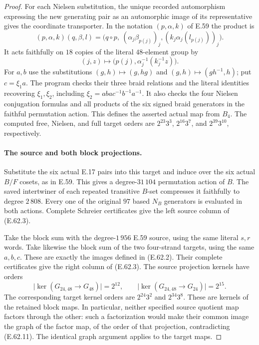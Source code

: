 \begin{proof}
For each Nielsen substitution, the unique recorded automorphism
expressing the new generating pair as an automorphic image of its
representative gives the coordinate transporter.  In the notation
$(p,\alpha,k)$ of E.59 the product is
\[
 (p,\alpha,k)(q,\beta,l)=
 \bigl(q\circ p,\ (\alpha_j\beta_{p(j)})_j,
                 (k_j\alpha_j(l_{p(j)}))_j\bigr).
 \tag{E.62.9}
\]
It acts faithfully on $18$ copies of the literal $48$-element group by
\[
 (j,z)\longmapsto
 \bigl(p(j),\alpha_j^{-1}(k_j^{-1}z)\bigr).
 \tag{E.62.10}
\]
For $a,b$ use the substitutions
$(g,h)\mapsto(g,hg)$ and $(g,h)\mapsto(gh^{-1},h)$; put $c=\xi_1a$.
The program checks their three braid relations and the literal identities
recovering $\xi_1,\xi_2$, including
$\xi_2=abac^{-1}b^{-1}a^{-1}$.  It also checks the four Nielsen
conjugation formulas and all products of the six signed braid generators
in the faithful permutation action.  This defines the asserted actual
map from $B_4$.  The computed free, Nielsen, and full target orders are
$2^{23}3^3$, $2^{16}3^7$, and $2^{39}3^{10}$, respectively.

\paragraph{The source and both block projections.}
Substitute the six actual E.17 pairs into this target and induce over the
six actual $B/F$ cosets, as in E.59.  This gives a degree-$31\,104$
permutation action of $B$.  The saved intertwiner of each repeated
transitive $B$-set compresses it faithfully to degree $2\,808$.
Every one of the original $97$ based $N_B$ generators is evaluated in
both actions.  Complete Schreier certificates give the left source
column of \textup{(E.62.3)}.

Take the block sum with the degree-$1\,956$ E.59 source, using the same
literal $s,r$ words.  Take likewise the block sum of the two four-strand
targets, using the same $a,b,c$.  These are exactly the images defined
in \textup{(E.62.2)}.  Their complete certificates give the right
column of \textup{(E.62.3)}.  The source projection kernels have orders
\[
 \bigl|\ker(G_{24,48}\to G_{48})\bigr|=2^{12},\qquad
 \bigl|\ker(G_{24,48}\to G_{24})\bigr|=2^{15}.
 \tag{E.62.11}
\]
The corresponding target kernel orders are $2^{24}3^2$ and $2^{34}3^8$.
These are kernels of the retained block maps.  In particular, neither
specified source quotient map factors through the other: such a
factorization would make their common image the graph of the factor map,
of the order of that projection, contradicting \textup{(E.62.11)}.
The identical graph argument applies to the target maps.


\end{proof}
